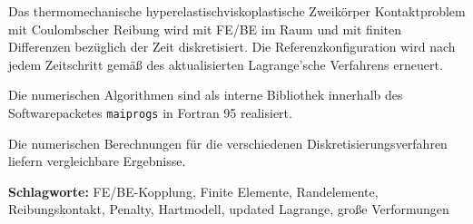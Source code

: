 Das thermomechanische  hyperelastischviskoplastische Zweikörper Kontaktproblem mit Coulombscher Reibung wird mit FE/BE im Raum und mit finiten Differenzen bezüglich der Zeit diskretisiert. Die Referenzkonfiguration wird nach  jedem Zeitschritt gemäß des aktualisierten Lagrange'sche Verfahrens erneuert. 

Die numerischen  Algorithmen sind als interne Bibliothek innerhalb des Softwarepacketes \texttt{maiprogs} in Fortran 95 realisiert.


Die numerischen Berechnungen für die verschiedenen Diskretisierungsverfahren liefern vergleichbare Ergebnisse.


\textbf{Schlagworte:} FE/BE-Kopplung,  Finite Elemente, Randelemente, Reibungskontakt, Penalty, Hartmodell, updated Lagrange, gro\ss{}e Verformungen
\vspace*{-2.6mm}
